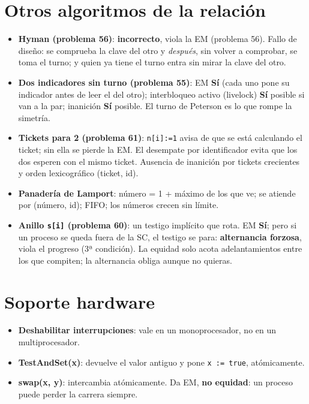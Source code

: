 \documentclass[11pt,a4paper,oneside]{report}
\newcommand{\si}{\textcolor{scdGreen}{\textbf{Sí}}}
\begin{document}
\section{Otros algoritmos de la relación}
\begin{itemize}[leftmargin=*]
  \item \textbf{Hyman (problema 56)}: \textbf{incorrecto}, viola la EM (problema 56). Fallo de diseño: se
        comprueba la clave del otro y \emph{después}, sin volver a comprobar, se toma el turno; y quien ya tiene el
        turno entra sin mirar la clave del otro.
  \item \textbf{Dos indicadores sin turno (problema 55)}: EM \si{} (cada uno pone su indicador antes de leer el del
        otro); interbloqueo activo (livelock) \si{} posible si van a la par; inanición \si{} posible. El turno de
        Peterson es lo que rompe la simetría.
  \item \textbf{Tickets para 2 (problema 61)}: \texttt{n[i]:=1} avisa de que se está calculando el ticket; sin ella
        se pierde la EM. El desempate por identificador evita que los dos esperen con el mismo ticket. Ausencia de
        inanición por tickets crecientes y orden lexicográfico (ticket, id).
  \item \textbf{Panadería de Lamport}: número = 1 + máximo de los que ve; se atiende por (número, id); FIFO;
        los números crecen sin límite.
  \item \textbf{Anillo \texttt{s[i]} (problema 60)}: un testigo implícito que rota. EM \si; pero si un proceso se
        queda fuera de la SC, el testigo se para: \textbf{alternancia forzosa}, viola el progreso (3ª condición).
        La equidad solo acota adelantamientos entre los que compiten; la alternancia obliga aunque no quieras.
\end{itemize}

\section{Soporte hardware}
\begin{itemize}[leftmargin=*]
  \item \textbf{Deshabilitar interrupciones}: vale en un monoprocesador, no en un multiprocesador.
  \item \textbf{TestAndSet(x)}: devuelve el valor antiguo y pone \texttt{x := true}, atómicamente.
  \item \textbf{swap(x, y)}: intercambia atómicamente. Da EM, \textbf{no equidad}: un proceso puede perder la
        carrera siempre.
\end{itemize}
\end{document}
